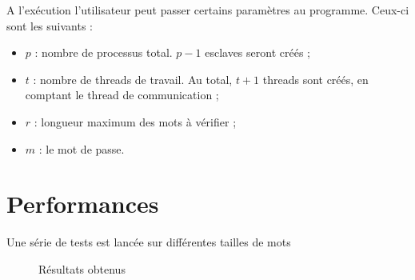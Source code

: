 A l'exécution l'utilisateur peut passer certains paramètres au programme. Ceux-ci sont les suivants :
\begin{itemize}
	\item $p$ : nombre de processus total. $p-1$ esclaves seront créés ;
	\item $t$ : nombre de threads de travail. Au total, $t+1$ threads sont créés, en comptant le thread de communication ;
	\item $r$ : longueur maximum des mots à vérifier ;
	\item $m$ : le mot de passe.
\end{itemize}


\section{Performances} %
\label{sec:perf}

Une série de tests est lancée sur différentes tailles de mots

\begin{figure}[H]
\centering
\caption{Résultats obtenus}
\label{fig:stats}
\end{figure}


